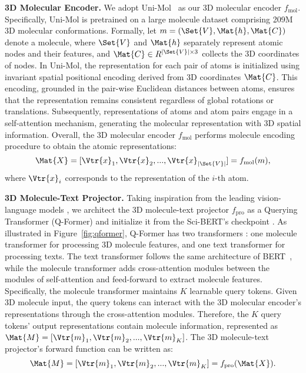 \textbf{3D Molecular Encoder.}
We adopt Uni-Mol~\citep{uni-mol} as our 3D molecular encoder $f_{\text{mol}}$.
Specifically, Uni-Mol is pretrained on a large molecule dataset comprising 209M 3D molecular conformations.
Formally, let $m=(\Set{V},\Mat{h}, \Mat{C})$ denote a molecule, where $\Set{V}$ and $\Mat{h}$ separately represent atomic nodes and their features, and $\Mat{C} \in \space{R}^{|\Set{V}| \times 3}$ collects the 3D coordinates of nodes.
In Uni-Mol, the representation for each pair of atoms is initialized using invariant spatial positional encoding derived from 3D coordinates $\Mat{C}$. 
This encoding, grounded in the pair-wise Euclidean distances between atoms, ensures that the representation remains consistent regardless of global rotations or translations.
Subsequently, representations of atoms and atom pairs engage in a self-attention mechanism, generating the molecular representation with 3D spatial information.
Overall, the 3D molecular encoder $f_{\text{mol}}$ performs molecule encoding procedure to obtain the atomic representations:
\begin{equation}\label{molecule-encoding}
\Mat{X} = [\Vtr{x}_1, \Vtr{x}_2,...,\Vtr{x}_{|\Set{V}|}] = f_{\text{mol}}(m),
\end{equation}
where $\Vtr{x}_i$ corresponds to the representation of the $i$-th atom.

\textbf{3D Molecule-Text Projector.}
Taking inspiration from the leading vision-language models \citep{blip2, instructblip}, we architect the 3D molecule-text projector $f_{\text{pro}}$ as a Querying Transformer (\ie Q-Former) and initialize it from the Sci-BERT's checkpoint \citep{scibert}. 
As illustrated in Figure~\ref{fig:qformer}, Q-Former has two transformers : one molecule transformer for processing 3D molecule features, and one text transformer for processing texts. The text transformer follows the same architecture of BERT~\citep{bert}, while the molecule transformer adds cross-attention modules between the modules of self-attention and feed-forward to extract molecule features.  
Specifically, the molecule transformer maintains $K$ learnable query tokens. Given 3D molecule input, the query tokens can interact with the 3D molecular encoder's representations through the cross-attention modules. Therefore, the $K$ query tokens' output representations contain molecule information, represented as $\Mat{M} = [\Vtr{m}_1, \Vtr{m}_2,...,\Vtr{m}_K]$.
The 3D molecule-text projector's forward function can be written as:
\vspace{-1mm}
\begin{equation}\label{cross-modal-projector}
\Mat{M} = [\Vtr{m}_1, \Vtr{m}_2,...,\Vtr{m}_K]=f_{\text{pro}}(\Mat{X}).
\end{equation}

